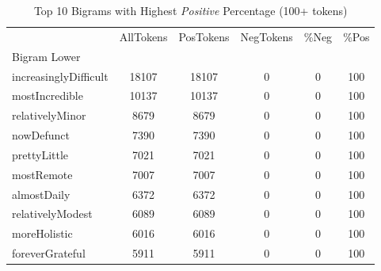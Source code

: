 

\singlespacing
\scriptsize\noindent
\begin{table}
\centering
\caption{Top 10 Bigrams with Highest \textit{Positive} Percentage (100+ tokens)}
\label{tab:top10PosPercent}
\begin{tabular}{*{1}{l}S[table-auto-round, table-format=7.2, drop-zero-decimal]
    S[table-auto-round, table-format=7.2, drop-zero-decimal]
    S[table-auto-round, table-format=7.2, drop-zero-decimal]
    S[table-auto-round, table-format=7.2, drop-zero-decimal]
    S[table-auto-round, table-format=7.2, drop-zero-decimal]}
\toprule
{} & {AllTokens} & {PosTokens} & {NegTokens} & {\%Neg} & {\%Pos} \\
{Bigram Lower} & {} & {} & {} & {} & {} \\
\midrule
increasinglyDifficult & 18107 & 18107 & 0 & 0 & 100 \\
mostIncredible & 10137 & 10137 & 0 & 0 & 100 \\
relativelyMinor & 8679 & 8679 & 0 & 0 & 100 \\
nowDefunct & 7390 & 7390 & 0 & 0 & 100 \\
prettyLittle & 7021 & 7021 & 0 & 0 & 100 \\
mostRemote & 7007 & 7007 & 0 & 0 & 100 \\
almostDaily & 6372 & 6372 & 0 & 0 & 100 \\
relativelyModest & 6089 & 6089 & 0 & 0 & 100 \\
moreHolistic & 6016 & 6016 & 0 & 0 & 100 \\
foreverGrateful & 5911 & 5911 & 0 & 0 & 100 \\
\bottomrule
\end{tabular}
\end{table}

\normalsize
\normalspacing